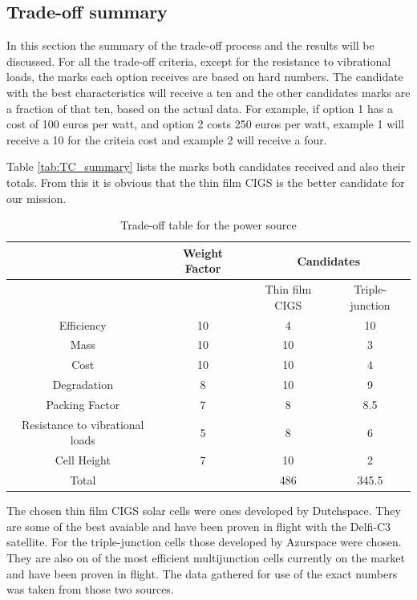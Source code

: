 \subsection{Trade-off summary}
In this section the summary of the trade-off process and the results will be discussed. For all the trade-off criteria, except for the resistance to vibrational loads, the marks each option receives are based on hard numbers. The candidate with the best characteristics will receive a ten and the other candidates marks are a fraction of that ten, based on the actual data. For example, if option 1 has a cost of 100 euros per watt, and option 2 costs 250 euros per watt, example 1 will receive a 10 for the criteia cost and example 2 will receive a four.

Table \ref{tab:TC_summary} lists the marks both candidates received and also their totals. From this it is obvious that the thin film CIGS is the better candidate for our mission.

\begin{table}
\begin{tabular}{|c||c|c|c|}
\hline
 & Weight Factor & \multicolumn{2}{|c|}{Candidates} \\ \hline
 & & Thin film CIGS & Triple-junction \\ \hline
  \hline
 Efficiency & 10 & 4 & 10 \\ \hline
 Mass & 10 & 10 & 3 \\ \hline
 Cost & 10 & 10 & 4 \\ \hline
 Degradation & 8 & 10 & 9 \\ \hline
 Packing Factor & 7 & 8 & 8.5 \\ \hline
 Resistance to vibrational loads & 5 & 8 & 6 \\ \hline
 Cell Height & 7 & 10 & 2 \\ \hline
 \hline
 Total & & 486 & 345.5 \\ \hline
 \end{tabular}
 \caption{Trade-off table for the power source}
 \label{tab:TO_summary}
 \end{table}
 
The chosen thin film CIGS solar cells were ones developed by Dutchspace. They are some of the best avaiable and have been proven in flight with the Delfi-C3 satellite. For the triple-junction cells those developed by Azurspace were chosen. They are also on of the most efficient multijunction cells currently on the market and have been proven in flight. The data gathered for use of the exact numbers was taken from those two sources.

